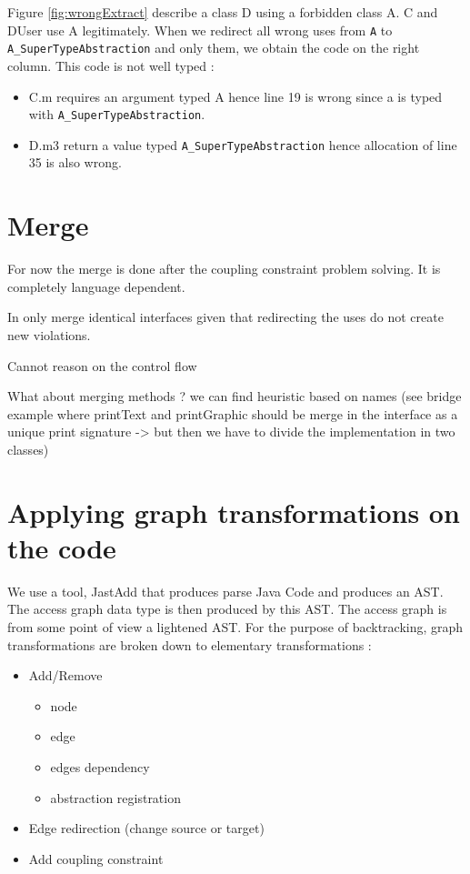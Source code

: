 \documentclass[]{article}
\begin{document}
Figure \ref{fig:wrongExtract} describe a class D using a forbidden class A. C and DUser use A legitimately. When we redirect all wrong uses from \texttt{A} to \texttt{A\_SuperTypeAbstraction} and only them, we obtain the code on the right column.
This code is not well typed : 

\begin{itemize}
\item C.m requires an argument typed A hence line 19 is wrong since a is typed with \texttt{A\_SuperTypeAbstraction}.
\item D.m3 return a value typed \texttt{A\_SuperTypeAbstraction} hence allocation of line 35 is also wrong. 
\end{itemize}


\section{Merge}
For now the merge is done after the coupling constraint problem solving. It is completely language dependent.

In only merge identical interfaces given that redirecting the uses do not create new violations.

Cannot reason on the control flow 

What about merging methods ?  we can find heuristic based on names (see bridge example where printText and printGraphic should be merge in the interface as a unique print signature -> but then we have to divide the implementation in two classes)


\section{Applying graph transformations on the code}
We use a tool, JastAdd that produces parse Java Code and produces an AST. The access graph data type is then produced by this AST. The access graph is from some point of view a lightened AST.
For the purpose of backtracking, graph transformations are broken down to elementary transformations : 
\begin{itemize}
\item Add/Remove
	\begin{itemize}
	\item node
	\item edge
	\item edges dependency 
	\item abstraction registration
	\end{itemize}
\item Edge redirection (change source or target)
\item Add coupling constraint	
\end{itemize}
\end{document}
